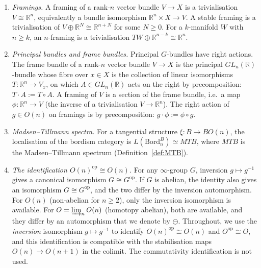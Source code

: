 \documentclass{amsart}
\begin{document}
\begin{enumerate}
    \item[$\flat_1$] \emph{Framings.} A framing of a rank-$n$ vector bundle $V \to X$ is a trivialisation $V \cong \mathbb{R}^n$, equivalently a bundle isomorphism $\mathbb{R}^n \times X \to V$. A stable framing is a trivialisation of $V \oplus \mathbb{R}^N \cong \mathbb{R}^{n+N}$ for some $N \geq 0$. For a $k$-manifold $W$ with $n \geq k$, an $n$-framing is a trivialisation $TW \oplus \mathbb{R}^{n-k} \cong \mathbb{R}^n$.
    \item[$\flat_2$]\label{conventions-item:frame} \emph{Principal bundles and frame bundles.} Principal $G$-bundles have right actions. The frame bundle of a rank-$n$ vector bundle $V \to X$ is the principal $GL_n(\mathbb{R})$-bundle whose fibre over $x \in X$ is the collection of linear isomorphisms $T \colon \mathbb{R}^n \to V_x$, on which $A \in GL_n(\mathbb{R})$ acts on the right by precomposition: $T \cdot A := T \circ A$. A framing of $V$ is a section of the frame bundle, i.e.\ a map $\phi \colon\mathbb{R}^n \to V$ (the inverse of a trivialisation $V \to \mathbb{R}^n$). The right action of $g \in O(n)$ on framings is by precomposition: $g \cdot \phi := \phi \circ g$.

    \item[$\flat_3$] \emph{Madsen--Tillmann spectra.} For a tangential structure $\xi \colon B \to BO(n)$, the localisation of the bordism category is $L(\mathrm{Bord}_n^B) \simeq MTB$, where $MTB$ is the Madsen--Tillmann spectrum (Definition~\ref{def:MTB}).
   \item[$\flat_4$]\label{conventions-item:O-op} \emph{The identification $O(n)^{\mathrm{op}} \cong O(n)$.} For any $\infty$-group $G$, inversion $g \mapsto g^{-1}$ gives a canonical isomorphism $G \cong G^{\mathrm{op}}$. If $G$ is abelian, the identity also gives an isomorphism $G \cong G^{\mathrm{op}}$, and the two differ by the inversion automorphism. For $O(n)$ (non-abelian for $n \geq 2$), only the inversion isomorphism is available. For $O = \varinjlim_n O(n)$ (homotopy abelian), both are available, and they differ by an automorphism that we denote by $\ominus$. Throughout, we use the \emph{inversion} isomorphism $g \mapsto g^{-1}$ to identify $O(n)^{\mathrm{op}} \cong O(n)$ and $O^{\mathrm{op}} \cong O$, and this identification is compatible with the stabilisation maps $O(n) \to O(n+1)$ in the colimit. The commutativity identification is not used.
\end{enumerate}
\end{document}

